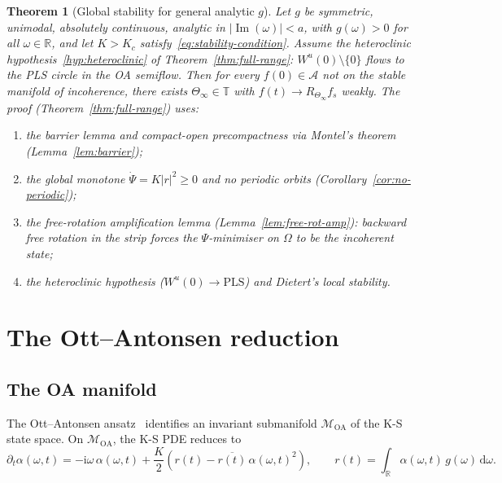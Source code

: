 \documentclass[11pt,a4paper]{article}
\newtheorem{theorem}{Theorem}[section]
\theoremstyle{definition}
\DeclareMathOperator{\im}{Im}
\newcommand{\R}{\mathbb{R}}
\newcommand{\T}{\mathbb{T}}
\begin{document}
\begin{theorem}[Global stability for general analytic $g$]\label{thm:analytic}
Let $g$ be symmetric, unimodal, absolutely continuous, analytic in $|\im(\omega)| < a$, with $g(\omega) > 0$ for all $\omega \in \R$, and let $K > K_c$ satisfy~\eqref{eq:stability-condition}. Assume the heteroclinic hypothesis~\ref{hyp:heteroclinic} of Theorem~\ref{thm:full-range}: $W^u(0) \setminus \{0\}$ flows to the PLS circle in the OA semiflow. Then for every $f(0) \in \mathcal{A}$ not on the stable manifold of incoherence, there exists $\Theta_\infty \in \T$ with $f(t) \to R_{\Theta_\infty} f_s$ weakly. The proof (Theorem~\ref{thm:full-range}) uses:
\begin{enumerate}[label=(\alph*)]
\item the barrier lemma and compact-open precompactness via Montel's theorem (Lemma~\ref{lem:barrier});
\item the global monotone $\dot\Psi = K|r|^2 \geq 0$ and no periodic orbits (Corollary~\ref{cor:no-periodic});
\item the free-rotation amplification lemma (Lemma~\ref{lem:free-rot-amp}): backward free rotation in the strip forces the $\Psi$-minimiser on $\Omega$ to be the incoherent state;
\item the heteroclinic hypothesis ($W^u(0) \to \mathrm{PLS}$) and Dietert's local stability.
\end{enumerate}
\end{theorem}


\section{The Ott--Antonsen reduction}\label{sec:oa}

\subsection{The OA manifold}

The Ott--Antonsen ansatz~\cite{ott-antonsen2008} identifies an invariant submanifold $\mathcal{M}_{\mathrm{OA}}$ of the K-S state space. On $\mathcal{M}_{\mathrm{OA}}$, the K-S PDE reduces to
\begin{equation}\label{eq:oa-ode}
\partial_t\alpha(\omega,t) = -\mathrm{i}\omega\,\alpha(\omega,t) + \frac{K}{2}\!\left(r(t) - \overline{r(t)}\,\alpha(\omega,t)^2\right), \qquad r(t) = \int_\R \alpha(\omega,t)\,g(\omega)\,\mathrm{d}\omega.
\end{equation}
\end{document}
